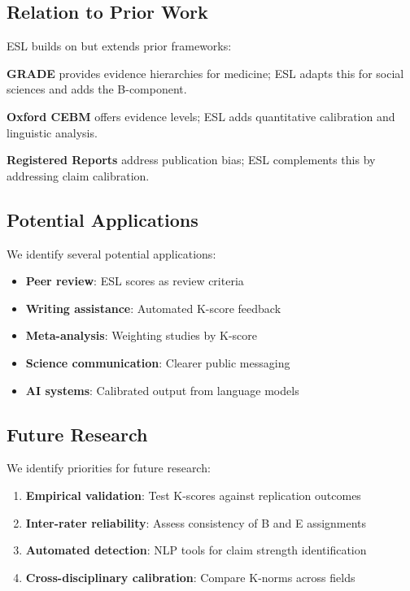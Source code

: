 \documentclass[11pt,a4paper]{article}
\begin{document}
\subsection{Relation to Prior Work}

ESL builds on but extends prior frameworks:

\textbf{GRADE} \citep{GRADE2004} provides evidence hierarchies for medicine;
ESL adapts this for social sciences and adds the B-component.

\textbf{Oxford CEBM} offers evidence levels; ESL adds quantitative
calibration and linguistic analysis.

\textbf{Registered Reports} \citep{Chambers2013} address publication bias;
ESL complements this by addressing claim calibration.

\subsection{Potential Applications}

We identify several potential applications:

\begin{itemize}
    \item \textbf{Peer review}: ESL scores as review criteria
    \item \textbf{Writing assistance}: Automated K-score feedback
    \item \textbf{Meta-analysis}: Weighting studies by K-score
    \item \textbf{Science communication}: Clearer public messaging
    \item \textbf{AI systems}: Calibrated output from language models
\end{itemize}

\subsection{Future Research}

We identify priorities for future research:

\begin{enumerate}
    \item \textbf{Empirical validation}: Test K-scores against replication
    outcomes
    \item \textbf{Inter-rater reliability}: Assess consistency of B and E
    assignments
    \item \textbf{Automated detection}: NLP tools for claim strength
    identification
    \item \textbf{Cross-disciplinary calibration}: Compare K-norms across
    fields
\end{enumerate}
\end{document}
